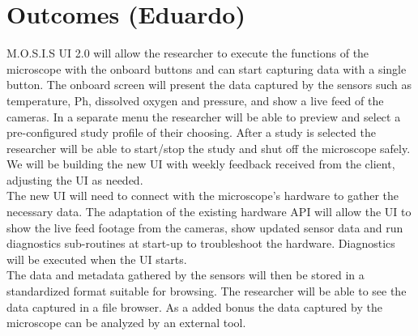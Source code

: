 \section{Outcomes (Eduardo)}
M.O.S.I.S UI 2.0 will allow the researcher to execute the functions of the microscope with the onboard buttons and can start capturing data with a single button. The onboard screen will present the data captured by the sensors such as temperature, Ph, dissolved oxygen and pressure, and show a live feed of the cameras. In a separate menu the researcher will be able to preview and select a pre-configured study profile of their choosing. After a study is selected the researcher will be able to start/stop the study and shut off the microscope safely. We will be building the new UI with weekly feedback received from the client, adjusting the UI as needed.\\
The new UI will need to connect with the microscope's hardware to gather the necessary data. The adaptation of the existing hardware API will allow the UI to show the live feed footage from the cameras, show updated sensor data and run diagnostics sub-routines at start-up to troubleshoot the hardware. Diagnostics will be executed when the UI starts.\\
The data and metadata gathered by the sensors will then be stored in a standardized format suitable for browsing. The researcher will be able to see the data captured in a file browser. As a added bonus the data captured by the microscope can be analyzed by an external tool. 